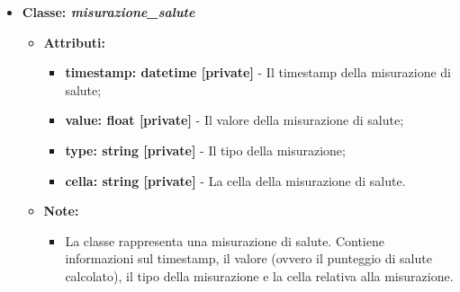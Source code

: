 \begin{itemize}
\item\textbf{Classe: \textit{misurazione\_salute}}
    \begin{itemize}
    \item\textbf{Attributi:}
        \begin{itemize}
            \item \textbf{timestamp: datetime [private]} - Il timestamp della misurazione di salute;
            \item \textbf{value: float [private]} - Il valore della misurazione di salute;
            \item \textbf{type: string [private]} - Il tipo della misurazione;
            \item \textbf{cella: string [private]} - La cella della misurazione di salute.
        \end{itemize}
        \item\textbf{Note:}
        \begin{itemize}
            \item La classe rappresenta una misurazione di salute. Contiene informazioni sul timestamp, il valore (ovvero il punteggio di salute calcolato), il tipo della misurazione e la cella relativa alla misurazione.
        \end{itemize}
    \end{itemize}


\end{itemize}
